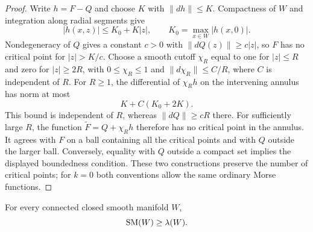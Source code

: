 \begin{proof}
Write $h=F-Q$ and choose $K$ with $\|dh\|\leq K$.
Compactness of $W$ and integration along radial segments give
\[
 |h(x,z)|\leq K_0+K|z|,
 \qquad K_0=\max_{x\in W}|h(x,0)|.
\]
Nondegeneracy of $Q$ gives a constant $c>0$ with
$\|dQ(z)\|\geq c|z|$, so $F$ has no critical point for $|z|>K/c$.
Choose a smooth cutoff $\chi_R$ equal to one for $|z|\leq R$ and zero
for $|z|\geq2R$, with $0\leq\chi_R\leq1$ and
$\|d\chi_R\|\leq C/R$, where $C$ is independent of $R$.
For $R\geq1$, the differential of $\chi_Rh$ on the intervening annulus
has norm at most
\[
 K+C(K_0+2K).
\]
This bound is independent of $R$, whereas $\|dQ\|\geq cR$ there.
For sufficiently large $R$, the function
$\widetilde F=Q+\chi_Rh$ therefore has no critical point in the annulus.
It agrees with $F$ on a ball containing all the critical points and
with $Q$ outside the larger ball.  Conversely, equality with $Q$ outside
a compact set implies the displayed boundedness condition.  These two
constructions preserve the number of critical points; for $k=0$ both
conventions allow the same ordinary Morse functions.
\end{proof}

\begin{proposition}\label{prop:stable-lower}
For every connected closed smooth manifold $W$,
\[
 \operatorname{SM}(W)\geq \lambda(W).
\]
\end{proposition}

